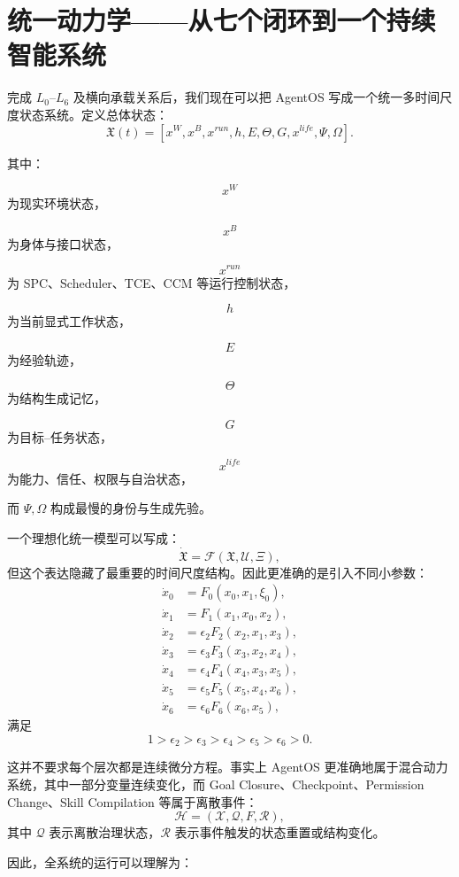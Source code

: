 \section{统一动力学——从七个闭环到一个持续智能系统}

完成 $L_0$--$L_6$ 及横向承载关系后，我们现在可以把 AgentOS 写成一个统一多时间尺度状态系统。定义总体状态：
\[
\mathfrak X(t)
=
\left[
x^W,
x^B,
x^{run},
h,
E,
\Theta,
G,
x^{life},
\Psi,
\Omega
\right].
\]

其中：

\[
x^W
\]
为现实环境状态，

\[
x^B
\]
为身体与接口状态，

\[
x^{run}
\]
为 SPC、Scheduler、TCE、CCM 等运行控制状态，

\[
h
\]
为当前显式工作状态，

\[
E
\]
为经验轨迹，

\[
\Theta
\]
为结构生成记忆，

\[
G
\]
为目标--任务状态，

\[
x^{life}
\]
为能力、信任、权限与自治状态，

而 $\Psi,\Omega$ 构成最慢的身份与生成先验。

一个理想化统一模型可以写成：
\[
\dot{\mathfrak X}
=
\mathcal F
\left(
\mathfrak X,
\mathcal U,
\Xi
\right),
\]
但这个表达隐藏了最重要的时间尺度结构。因此更准确的是引入不同小参数：
\[
\begin{aligned}
\dot{x}_0 &= F_0(x_0,x_1,\xi_0),\\
\dot{x}_1 &= F_1(x_1,x_0,x_2),\\
\dot{x}_2 &= \epsilon_2F_2(x_2,x_1,x_3),\\
\dot{x}_3 &= \epsilon_3F_3(x_3,x_2,x_4),\\
\dot{x}_4 &= \epsilon_4F_4(x_4,x_3,x_5),\\
\dot{x}_5 &= \epsilon_5F_5(x_5,x_4,x_6),\\
\dot{x}_6 &= \epsilon_6F_6(x_6,x_5),
\end{aligned}
\]
满足
\[
1
>
\epsilon_2
>
\epsilon_3
>
\epsilon_4
>
\epsilon_5
>
\epsilon_6
>
0.
\]

这并不要求每个层次都是连续微分方程。事实上 AgentOS 更准确地属于混合动力系统，其中一部分变量连续变化，而 Goal Closure、Checkpoint、Permission Change、Skill Compilation 等属于离散事件：
\[
\mathcal H
=
(\mathcal X,\mathcal Q,F,\mathcal R),
\]
其中 $\mathcal Q$ 表示离散治理状态，$\mathcal R$ 表示事件触发的状态重置或结构变化。

因此，全系统的运行可以理解为：
\begin{statementbox}
\centering
{}
\end{statementbox}

